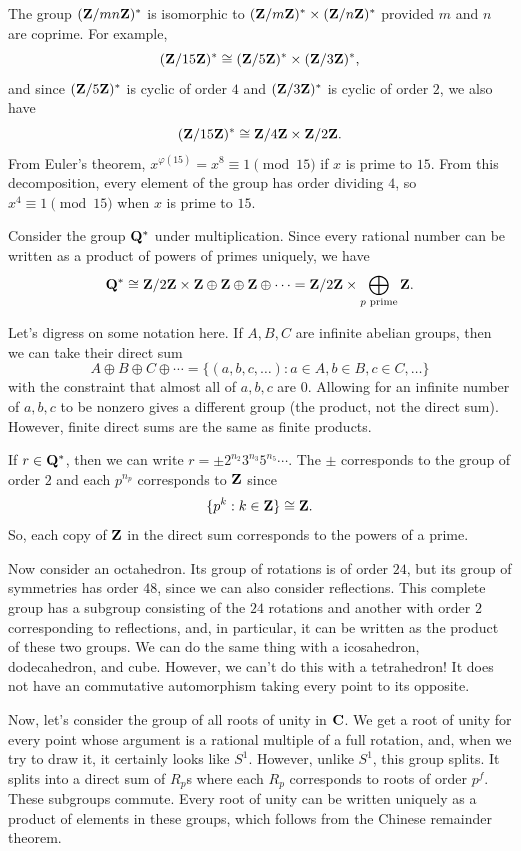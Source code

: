 \documentclass[11pt, oneside]{amsart}
\begin{document}
The group $(\mathbf Z/mn\mathbf Z)^*$ is isomorphic to $(\mathbf Z/m\mathbf Z)^*\times (\mathbf Z/n\mathbf Z)^*$ provided $m$ and $n$ are coprime. For example,
$$
(\mathbf Z/15\mathbf Z)^* \cong (\mathbf Z/5\mathbf Z)^* \times (\mathbf Z/3\mathbf Z)^*,
$$ 
and since $(\mathbf Z/5\mathbf Z)^*$ is cyclic of order $4$ and $(\mathbf Z/3\mathbf Z)^*$ is cyclic of order $2$, we also have
$$
(\mathbf Z/15\mathbf Z)^* \cong \mathbf Z/4\mathbf Z \times \mathbf Z/2\mathbf Z.
$$
From Euler's theorem, $x^{\varphi(15)} = x^8\equiv 1\pmod {15}$ if $x$ is prime to $15$. From this decomposition, every element of the group has order dividing $4$, so $x^4\equiv 1\pmod{15}$ when $x$ is prime to $15$.

Consider the group $\mathbf Q^*$ under multiplication. Since every rational number can be written as a product of powers of primes uniquely, we have 
$$
\mathbf Q^* \cong \mathbf Z/2\mathbf Z \times \mathbf Z\oplus \mathbf Z \oplus \mathbf Z \oplus \cdots = \mathbf Z/2\mathbf Z \times \bigoplus_{\text{$p$ prime}} \mathbf Z.
$$

Let's digress on some notation here. If $A,B,C$ are infinite abelian groups, then we can take their direct sum
$$
A \oplus B \oplus C \oplus \cdots = \{ (a,b,c,\hdots) : a\in A,b\in B, c\in C,\hdots\}
$$
with the constraint that almost all of $a,b,c$ are $0$. Allowing for an infinite number of $a,b,c$ to be nonzero gives a different group (the product, not the direct sum). However, finite direct sums are the same as finite products.

If $r\in \mathbf Q^*$, then we can write $r = \pm 2^{n_2} 3^{n_3} 5^{n_5}\cdots$. The $\pm$ corresponds to the group of order $2$ and each $p^{n_p}$ corresponds to $\mathbf Z$ since
$$
\{ p^k : k\in \mathbf Z\} \cong \mathbf Z.
$$
So, each copy of $\mathbf Z$ in the direct sum corresponds to the powers of a prime.

Now consider an octahedron. Its group of rotations is of order $24$, but its group of symmetries has order $48$, since we can also consider reflections. This complete group has a subgroup consisting of the $24$ rotations and another with order $2$ corresponding to reflections, and, in particular, it can be written as the product of these two groups. We can do the same thing with a icosahedron, dodecahedron, and cube. However, we can't do this with a tetrahedron! It does not have an commutative automorphism taking every point to its opposite.

Now, let's consider the group of all roots of unity in $\mathbf C$. We get a root of unity for every point whose argument is a rational multiple of a full rotation, and, when we try to draw it, it certainly looks like $S^1$. However, unlike $S^1$, this group splits. It splits into a direct sum of $R_p$s where each $R_p$ corresponds to roots of order $p^f$. These subgroups commute. Every root of unity can be written uniquely as a product of elements in these groups, which follows from the Chinese remainder theorem. 
\end{document}
